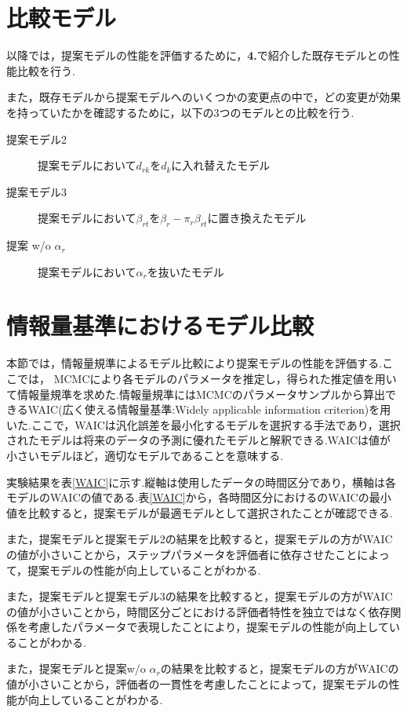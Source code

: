 \documentclass[a4paper,11pt,oneside,openany]{jsbook}
\begin{document}
\newpage
\section{比較モデル}
以降では，提案モデルの性能を評価するために，\textbf{4.}で紹介した既存モデルとの性能比較を行う.

また，既存モデルから提案モデルへのいくつかの変更点の中で，どの変更が効果を持っていたかを確認するために，以下の3つのモデルとの比較を行う.

\begin{description}
\item [提案モデル2]提案モデルにおいて$d_{rk}$を$d_k$に入れ替えたモデル
\item[提案モデル3]提案モデルにおいて$\beta_{rt}$を$\beta_{r} - \pi_{r}\beta_{rt}$に置き換えたモデル
\item[提案 w/o $\alpha_r$]提案モデルにおいて$\alpha_r$を抜いたモデル
\end{description}

\section{情報量基準におけるモデル比較}

本節では，情報量規準によるモデル比較により提案モデルの性能を評価する.ここでは， MCMCにより各モデルのパラメータを推定し，得られた推定値を用いて情報量規準を求めた.情報量規準にはMCMCのパラメータサンプルから算出できるWAIC(広く使える情報量基準:Widely applicable information criterion)を用いた.ここで，WAICは汎化誤差を最小化するモデルを選択する手法であり，選択されたモデルは将来のデータの予測に優れたモデルと解釈できる.WAICは値が小さいモデルほど，適切なモデルであることを意味する.

実験結果を表\ref{WAIC}に示す.縦軸は使用したデータの時間区分であり，横軸は各モデルのWAICの値である.表\ref{WAIC}から，各時間区分におけるのWAICの最小値を比較すると，提案モデルが最適モデルとして選択されたことが確認できる.

また，提案モデルと提案モデル2の結果を比較すると，提案モデルの方がWAICの値が小さいことから，ステップパラメータを評価者に依存させたことによって，提案モデルの性能が向上していることがわかる.

また，提案モデルと提案モデル3の結果を比較すると，提案モデルの方がWAICの値が小さいことから，時間区分ごとにおける評価者特性を独立ではなく依存関係を考慮したパラメータで表現したことにより，提案モデルの性能が向上していることがわかる.

また，提案モデルと提案w/o $\alpha_r$の結果を比較すると，提案モデルの方がWAICの値が小さいことから，評価者の一貫性を考慮したことによって，提案モデルの性能が向上していることがわかる.
\end{document}
